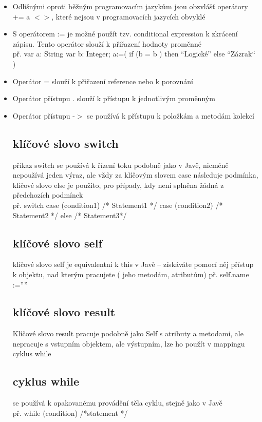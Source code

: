 \documentclass[11pt,a4paper]{article}   	%
\begin{document}
\begin{itemize}
  \item		Odlišnými oproti běžným programovacím jazykům jsou obzvlášť operátory
  			+= a $<>$, které nejsou v programovacích jazycích obvyklé
  \item		S operátorem := je možné použít tzv.  conditional expression k zkrácení
  			zápisu. Tento operátor slouží k přiřazení  hodnoty proměnné \\př. var a:
  			String var b: Integer; a:=( if (b = b ) then “Logické” else “Zázrak“ )
  \item		Operátor = slouží k přiřazení reference nebo k porovnání
  \item 	Operátor přístupu . slouží k přístupu k jednotlivým proměnným
  \item 	Operátor přístupu -$>$ se používá k přístupu k položkám a metodám
  kolekcí

\subsection{klíčové slovo switch}
příkaz switch se používá k řízení toku podobně jako v Javě, nicméně nepoužívá
jeden výraz,  ale vždy za klíčovým slovem case následuje podmínka, klíčové slovo
else je použito, pro případy, kdy není splněna žádná z předchozích podmínek \\
př. switch { case (condition1) /* Statement1 */ case (condition2) /* Statement2 */ else /* Statement3*/ }

\subsection {klíčové slovo self}
klíčové slovo self je equivalentní k this v Javě – získáváte pomocí něj přístup 
k objektu, nad kterým pracujete ( jeho metodám, atributům) př. self.name :=””

\subsection {klíčové slovo result}
Klíčové slovo result pracuje podobně jako Self s atributy a metodami, ale
nepracuje s  vstupním objektem, ale výstupním, lze ho použít v mappingu cyklus while

\subsection{cyklus while}
se používá k opakovanému provádění těla cyklu, stejně jako v Javě \\
př. while (condition){ /*statement */ }



\end{itemize}
\end{document}
